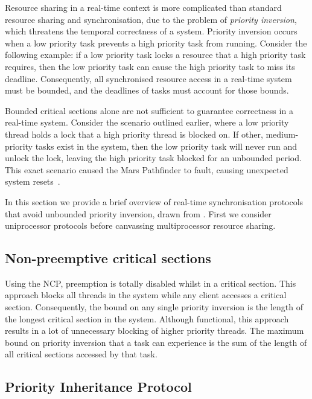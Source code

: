 Resource sharing in a real-time context is more complicated than standard resource sharing and
synchronisation, due to the problem of \emph{priority inversion}, which threatens the temporal
correctness of a system.  Priority inversion occurs when a low priority task prevents a high
priority task from running.  Consider the following example: if a low priority task locks a resource
that a high priority task requires, then the low priority task can cause the high priority task to
miss its deadline.  Consequently, all synchronised resource access in a real-time system must be
bounded, and the deadlines of tasks must account for those bounds.

Bounded critical sections alone are not sufficient to guarantee correctness in a real-time
system. Consider the scenario outlined earlier, where a low priority thread holds a lock that a high
priority thread is blocked on.  If other, medium-priority tasks exist in the system, then the low
priority task will never run and unlock the lock, leaving the high priority task blocked for an
unbounded period.  This exact scenario caused the Mars Pathfinder to fault, causing unexpected
system resets~\citep{Mars_Pathfinder}.

In this section we provide a brief overview of real-time synchronisation protocols that
avoid unbounded priority inversion, drawn from \citet{Sha_RL_90}. First we consider uniprocessor
protocols before canvassing multiprocessor resource sharing.

\subsection{Non-preemptive critical sections}

Using the \gls{NCP}, preemption is totally disabled whilst in a critical section.  This approach blocks
all threads in the system while any client accesses a critical section.  Consequently, the bound on
any single priority inversion is the length of the longest critical section in the system.  Although
functional, this approach results in a lot of unnecessary blocking of higher priority threads.  The
maximum bound on priority inversion that a task can experience is the sum of the length of all
critical sections accessed by that task. 

\subsection{Priority Inheritance Protocol}
\label{sec:pip}

